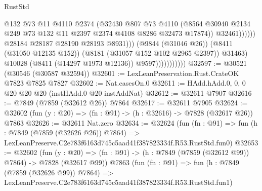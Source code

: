 \begin{lexlean}{RustStd}
\begin{coremodule}
                                              @132
                                              @73
                                              @11
                                              @4110
                                              @2374
                                              (@32430
                                                @807
                                                @73
                                                @4110
                                                (@8564
                                                  @30940
                                                  @2134
                                                  @249
                                                  @73
                                                  @132
                                                  @11
                                                  @2397
                                                  @2374
                                                  @4108
                                                  @8286
                                                  @32473
                                                  @17874))
                                              @32461))))))
                                  @28184
                                  @28187
                                  @28190
                                  @28193
                                  @8931)))
                            (@9844 (@31046 @26))
                            (@8411 (@31050 @12135 @152))
                            (@8181 (@31057 @152 @102 @2965 @2397))
                            @31463)
                          @10028
                          (@8411 (@14297 @1973 @12136))
                          @9597)))))))))))
@32597 := @30521 (@30546 (@30587 @32594))
@32601 := LexLeanPreservation.Rust.CrateOK @7823 @7825 @7827
@32602 := Nat.casesOn.{0}
@32611 := HAdd.hAdd.{0, 0, 0} @20 @20 @20 (instHAdd.{0} @20 instAddNat)
@32612 := @32611 @7907
@32616 := @7849 (@7859 (@32612 @26)) @7864
@32617 := @32611 @7905
@32624 := @32602 (fun (y : @20) => (fn : @91) -> (h : @32616) -> @7828 (@32617 @26)) @7863
@32626 := @32611 Nat.zero
@32634 := @32624
    (fun (fn : @91) =>
    fun (h : @7849 (@7859 (@32626 @26)) @7864) =>
    LexLeanPreserve.C2e783f6163d745c5aad41f387823334f.R53.RustStd.fun0)
@32653 := @32602
    (fun (y : @20) => (fn : @91) -> (h : @7849 (@7859 (@32612 @99)) @7864) -> @7828 (@32617 @99))
    @7863
    (fun (fn : @91) =>
    fun (h : @7849 (@7859 (@32626 @99)) @7864) =>
    LexLeanPreserve.C2e783f6163d745c5aad41f387823334f.R53.RustStd.fun1)

\end{coremodule}
\end{lexlean}

